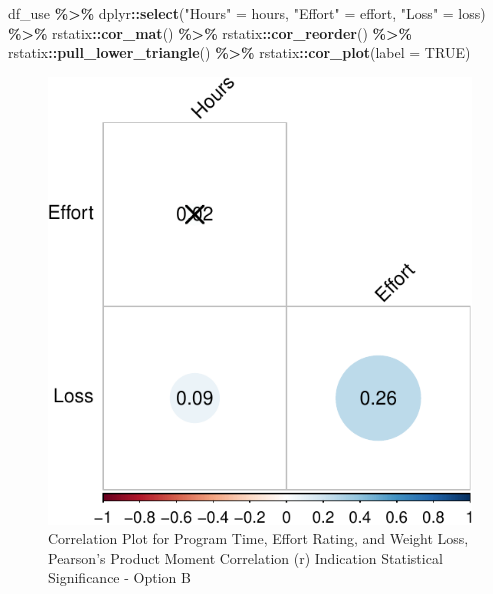 \documentclass[
]{article}
\newenvironment{Shaded}{\begin{snugshade}}{\end{snugshade}}
\newcommand{\AttributeTok}[1]{\textcolor[rgb]{0.13,0.29,0.53}{#1}}
\newcommand{\ConstantTok}[1]{\textcolor[rgb]{0.56,0.35,0.01}{#1}}
\newcommand{\FunctionTok}[1]{\textcolor[rgb]{0.13,0.29,0.53}{\textbf{#1}}}
\newcommand{\NormalTok}[1]{#1}
\newcommand{\OtherTok}[1]{\textcolor[rgb]{0.56,0.35,0.01}{#1}}
\newcommand{\SpecialCharTok}[1]{\textcolor[rgb]{0.81,0.36,0.00}{\textbf{#1}}}
\newcommand{\StringTok}[1]{\textcolor[rgb]{0.31,0.60,0.02}{#1}}
\begin{document}
\clearpage

\begin{Shaded}
\begin{Highlighting}[]
\NormalTok{df\_use }\SpecialCharTok{\%\textgreater{}\%} 
\NormalTok{  dplyr}\SpecialCharTok{::}\FunctionTok{select}\NormalTok{(}\StringTok{"Hours"} \OtherTok{=}\NormalTok{ hours, }
                \StringTok{"Effort"} \OtherTok{=}\NormalTok{ effort, }
                \StringTok{"Loss"} \OtherTok{=}\NormalTok{ loss) }\SpecialCharTok{\%\textgreater{}\%} 
\NormalTok{  rstatix}\SpecialCharTok{::}\FunctionTok{cor\_mat}\NormalTok{() }\SpecialCharTok{\%\textgreater{}\%}   
\NormalTok{  rstatix}\SpecialCharTok{::}\FunctionTok{cor\_reorder}\NormalTok{() }\SpecialCharTok{\%\textgreater{}\%}
\NormalTok{  rstatix}\SpecialCharTok{::}\FunctionTok{pull\_lower\_triangle}\NormalTok{() }\SpecialCharTok{\%\textgreater{}\%}
\NormalTok{  rstatix}\SpecialCharTok{::}\FunctionTok{cor\_plot}\NormalTok{(}\AttributeTok{label =} \ConstantTok{TRUE}\NormalTok{)}
\end{Highlighting}
\end{Shaded}

\begin{figure}[hb]

\includegraphics{Appendix_ex_weightloss_files/figure-latex/unnamed-chunk-23-1} \hfill{}

\caption{Correlation Plot for Program Time, Effort Rating, and Weight Loss, Pearson's Product Moment Correlation (r) Indication Statistical Significance - Option B}\label{fig:unnamed-chunk-23}
\end{figure}
\end{document}
